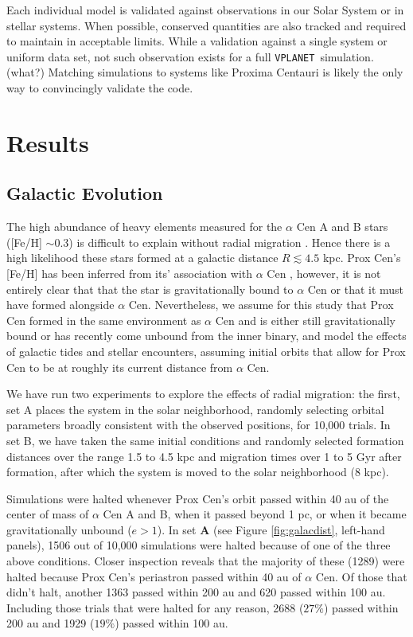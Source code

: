 \documentclass[preprint,12pt]{aastex}
\newcommand{\xxx}[1]{{\color{red} #1}} %
\def\vplanet{\texttt{\footnotesize{VPLANET}}\xspace}
\begin{document}
Each individual model is validated against observations in our Solar
System or in stellar systems. When possible, conserved quantities are
also tracked and \xxx{required to maintain in acceptable limits}. \xxx{While a
validation against a single system or uniform data set, not such
observation exists for a full \vplanet~simulation. (what?)} Matching
simulations to systems like Proxima Centauri is likely the only way to
\xxx{convincingly} validate the code.

\section{Results\label{sec:results}}

\subsection{Galactic Evolution}
\label{sec:results:galactic}
The high abundance of heavy elements measured for the $\alpha$ Cen 
A and B stars ([Fe/H] $\sim 0.3$) is difficult to explain without radial 
migration \citep{Kordopatis15,Loebman16}. Hence there is a high likelihood 
these stars formed at a galactic distance $R\lesssim 4.5$ kpc. Prox Cen's [Fe/H] 
has been inferred from its' association with $\alpha$ Cen \citep{Johnson2009},
however, it is not entirely clear that that the star is gravitationally bound to 
$\alpha$ Cen \citep{MatvienkoOrlov14} or that it must have formed alongside 
$\alpha$ Cen. Nevertheless, we assume for this study that Prox Cen formed in 
the same environment as $\alpha$ Cen and is either still gravitationally bound or
has recently come unbound from the inner binary, and model the effects of 
galactic tides and stellar encounters, assuming initial orbits that allow for 
Prox Cen to be at roughly its current distance from $\alpha$ Cen.

We have run two experiments to explore the effects of radial migration: the first, 
set A places the system in the solar neighborhood, randomly selecting 
orbital parameters broadly consistent with the observed positions, for 10,000 
trials. In set B, we have taken the same initial conditions and randomly 
selected formation distances over the range 1.5 to 4.5 kpc and migration times
over 1 to 5 Gyr after formation, after which the system is moved to the solar 
neighborhood (8 kpc). 

Simulations were halted whenever Prox Cen's orbit passed within 40 au of 
the center of mass of $\alpha$ Cen A and B, when it passed beyond 1 pc,
or when it became gravitationally unbound ($e > 1$). In set \textbf{A} 
(see Figure \ref{fig:galacdist}, left-hand panels), 1506 
out of 10,000 simulations were halted because of one of the three above conditions.
Closer inspection reveals that the majority of these (1289) were halted because 
Prox Cen's periastron passed within 40 au of $\alpha$ Cen. Of those that didn't
halt, another 1363 passed within 200 au and 620 passed within 100 au. Including 
those trials that were halted for any reason, 2688 ($27\%$) passed within 200 au and
1929 ($19\%$) passed within 100 au. 
\end{document}
